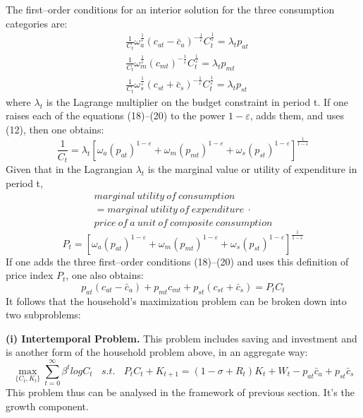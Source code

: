 \documentclass{article}
\begin{document}
    The first–order conditions for an interior solution for the three consumption categories are:
    \begin{align}
        &\frac{1}{C_t} \omega_a^{\frac{1}{\varepsilon}} (c_{at}-\bar{c}_a)^{-\frac{1}{\varepsilon}} C_t^{\frac{1}{\varepsilon}}=\lambda_t p_{at}\\
        &\frac{1}{C_t} \omega_m^{\frac{1}{\varepsilon}} (c_{mt})^{-\frac{1}{\varepsilon}} C_t^{\frac{1}{\varepsilon}}=\lambda_t p_{mt}\\
        &\frac{1}{C_t} \omega_s^{\frac{1}{\varepsilon}} (c_{st}+\bar{c}_s)^{-\frac{1}{\varepsilon}} C_t^{\frac{1}{\varepsilon}}=\lambda_t p_{st}
    \end{align}
    where $\lambda_t$ is the Lagrange multiplier on the budget constraint in period t. If one raises each of the equations (18)–(20) to the power $1-\varepsilon$, adds them, and uses (12), then one obtains:
    \begin{equation}
        \frac{1}{C_t}=\lambda_t [\omega_a(p_{at})^{1-\varepsilon} + \omega_m(p_{mt})^{1-\varepsilon} + \omega_s(p_{st})^{1-\varepsilon}]^{\frac{1}{1-\varepsilon}}
    \end{equation}
    Given that in the Lagrangian $\lambda_t$ is the marginal value or utility of expenditure in period t, 
    \begin{multline*}
        marginal\ utility\ of\ consumption\\
        =marginal\ utility\ of\ expenditure\ \cdot\\ price\ of\ a\ unit\ of\ composite\ consumption 
    \end{multline*}
    \begin{equation}
        P_t=[\omega_a(p_{at})^{1-\varepsilon} + \omega_m(p_{mt})^{1-\varepsilon} + \omega_s(p_{st})^{1-\varepsilon}]^{\frac{1}{1-\varepsilon}}
    \end{equation}
    If one adds the three first–order conditions (18)–(20) and uses this definition of price index $P_t$, one also obtains:
    \begin{equation}
        p_{at}(c_{at}-\bar{c}_a)+p_{mt}c_{mt}+p_{st}(c_{st}+\bar{c}_s)=P_tC_t
    \end{equation}
    It follows that the household’s maximization problem can be broken down into two subproblems:

    \textbf{(i) Intertemporal Problem.} This problem includes saving and investment and is another form of the household problem above, in an aggregate way:
    \begin{equation*}
        \max_{\{ C_t,K_t \}} \sum_{t=0}^{\infty} \beta^t log C_t\ \ \ \ 
        s.t.\ \ \ \ P_tC_t+K_{t+1}=(1-\sigma+R_t)K_t+W_t-p_{at}\bar{c}_a+p_{st}\bar{c}_s
    \end{equation*}
    This problem thus can be analysed in the framework of previous section. It's the growth component.
\end{document}

